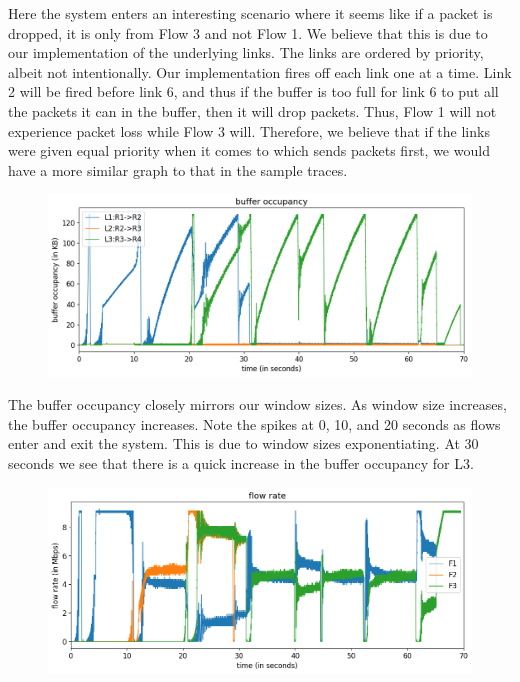 \documentclass{article}
\begin{document}
Here the system enters an interesting scenario where it seems like if a packet is dropped, it is only from Flow 3 and not Flow 1. We believe that this is due to our implementation of the underlying links. The links are ordered by priority, albeit not intentionally. Our implementation fires off each link one at a time. Link 2 will be fired before link 6, and thus if the buffer is too full for link 6 to put all the packets it can in the buffer, then it will drop packets. Thus, Flow 1 will not experience packet loss while Flow 3 will. Therefore, we believe that if the links were given equal priority when it comes to which sends packets first, we would have a more similar graph to that in the sample traces.

\begin{figure}[H]
\centering
\includegraphics[width = \textwidth]{test_case2_reno buffer occupancy.png}
\end{figure}

The buffer occupancy closely mirrors our window sizes. As window size increases, the buffer occupancy increases. Note the spikes at 0, 10, and 20 seconds as flows enter and exit the system. This is due to window sizes exponentiating. At 30 seconds we see that there is a quick increase in the buffer occupancy for L3.

\begin{figure}[H]
\centering
\includegraphics[width = \textwidth]{test_case2_reno flow rate.png}
\end{figure}
\end{document}
